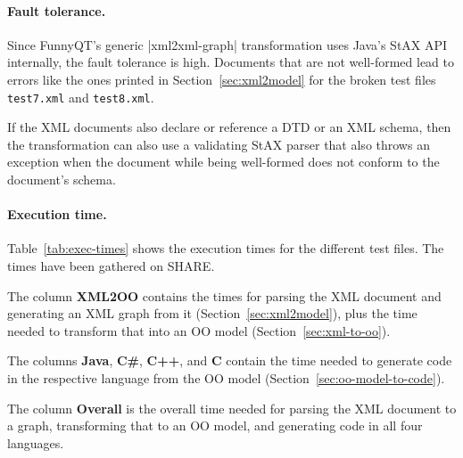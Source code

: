 \documentclass[a4paper]{article}
\newcommand{\code}{\clojureinline}
\begin{document}
\paragraph{Fault tolerance.}
\label{sec:fault-tolerance}

Since FunnyQT's generic \code|xml2xml-graph| transformation uses Java's StAX
API internally, the fault tolerance is high.  Documents that are not
well-formed lead to errors like the ones printed in Section~\ref{sec:xml2model}
for the broken test files \texttt{test7.xml} and \texttt{test8.xml}.

If the XML documents also declare or reference a DTD or an XML schema, then the
transformation can also use a validating StAX parser that also throws an
exception when the document while being well-formed does not conform to the
document's schema.


\paragraph{Execution time.}
\label{sec:execution-time}

Table~\ref{tab:exec-times} shows the execution times for the different test
files.  The times have been gathered on SHARE.

The column \textbf{XML2OO} contains the times for parsing the XML document and
generating an XML graph from it (Section~\ref{sec:xml2model}), plus the time
needed to transform that into an OO model (Section~\ref{sec:xml-to-oo}).

The columns \textbf{Java}, \textbf{C\#}, \textbf{C++}, and \textbf{C} contain
the time needed to generate code in the respective language from the OO model
(Section~\ref{sec:oo-model-to-code}).

The column \textbf{Overall} is the overall time needed for parsing the XML
document to a graph, transforming that to an OO model, and generating code in
all four languages.
\end{document}
